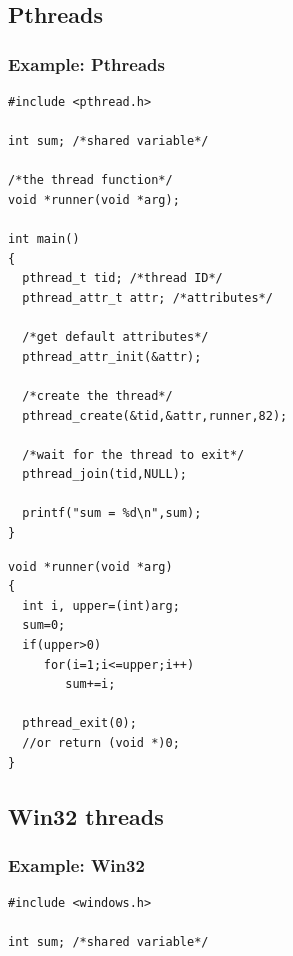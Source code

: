 \documentclass[CJKutf8,xcolor=pdftex,dvipsnames,table]{beamer}
\begin{document}
\begin{CJK*}{UTF8}{song}
  \subsection{Pthreads}

  \begin{frame}[fragile]
  \frametitle{Example: Pthreads} \pause
  \begin{minipage}[c]{0.6\textwidth}

\begin{lstlisting}
#include <pthread.h>

int sum; /*shared variable*/

/*the thread function*/
void *runner(void *arg);

int main()
{
  pthread_t tid; /*thread ID*/
  pthread_attr_t attr; /*attributes*/

  /*get default attributes*/
  pthread_attr_init(&attr);

  /*create the thread*/
  pthread_create(&tid,&attr,runner,82);

  /*wait for the thread to exit*/
  pthread_join(tid,NULL);

  printf("sum = %d\n",sum);
}
\end{lstlisting}

  \end{minipage}%
  \begin{minipage}[c]{0.4\textwidth}
\lstset{frame=single}
\begin{lstlisting}
void *runner(void *arg)
{
  int i, upper=(int)arg;
  sum=0;
  if(upper>0)
     for(i=1;i<=upper;i++)
        sum+=i;

  pthread_exit(0);
  //or return (void *)0;
}
\end{lstlisting}

  \end{minipage}
\end{frame}

  \subsection{Win32 threads}

  \begin{frame}[fragile]
  \frametitle{Example: Win32} \pause
  \begin{minipage}[c]{0.6\textwidth}

\begin{lstlisting}
#include <windows.h>

int sum; /*shared variable*/


\end{lstlisting}
\end{minipage}
\end{frame}
\end{CJK*}
\end{document}
